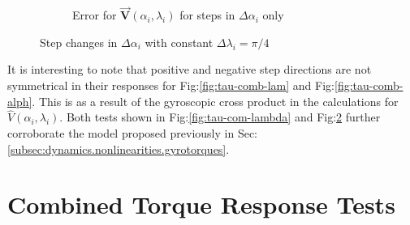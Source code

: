 \begin{figure}[htbp]
\begin{subfigure}{0.49\textwidth}
\caption{Error for $\vec{\mathbf{V}}(\alpha_i,\lambda_i)$ for steps in $\Delta\alpha_i$ only}
\label{fig:tau-comb-alph-r}
\end{subfigure}
\vspace{-6pt}
\caption{Step changes in $\Delta\alpha_i$ with constant $\Delta\lambda_i=\pi/4$}
\label{fig:tau-comb-alpha}
\vspace{-16pt}
\end{figure}
\par
It is interesting to note that positive and negative step directions are not symmetrical in their responses for Fig:\ref{fig:tau-comb-lam} and Fig:\ref{fig:tau-comb-alph}. This is as a result of the gyroscopic cross product in the calculations for $\hat{V}(\alpha_i,\lambda_i)$. Both tests shown in Fig:\ref{fig:tau-com-lambda} and Fig:\ref{fig:tau-comb-alpha} further corroborate the model proposed previously in Sec:\ref{subsec:dynamics.nonlinearities.gyrotorques}.
\newpage
\section{Combined Torque Response Tests}
\label{app:tau-comb-test}
